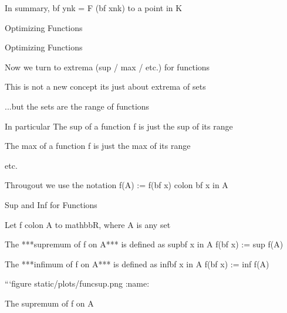 \documentclass[letterpaper,10pt,english]{jupyterBook}
\begin{document}
\begin{sphinxVerbatim}[commandchars=\\\{\}]
\PYGZpc{}In summary, \PYGZdl{}\PYGZob{}\PYGZbs{}bf y\PYGZcb{}\PYGZus{}\PYGZob{}n\PYGZus{}k\PYGZcb{} = F (\PYGZob{}\PYGZbs{}bf x\PYGZcb{}\PYGZus{}\PYGZob{}n\PYGZus{}k\PYGZcb{}) \PYGZbs{}to\PYGZdl{} a point in \PYGZdl{}K\PYGZdl{}

\PYGZpc{}

\PYGZsh{}\PYGZsh{} Optimizing Functions

\PYGZsh{}\PYGZsh{}\PYGZsh{} Optimizing Functions

Now we turn to extrema (sup / max / etc.) for functions

This is not a new concept \PYGZhy{}\PYGZhy{}\PYGZhy{} it\PYGZsq{}s just about extrema of sets

...but the sets are the range of functions

In particular
\PYGZpc{}
\PYGZhy{} The sup of a function \PYGZdl{}f\PYGZdl{} is just the sup of its range

\PYGZhy{} The max of a function \PYGZdl{}f\PYGZdl{} is just the max of its range

\PYGZhy{} etc.

Througout we use the notation
\PYGZpc{}
\PYGZdl{}\PYGZdl{}
\PYGZpc{}
f(A) := \PYGZbs{}\PYGZob{} f(\PYGZob{}\PYGZbs{}bf x\PYGZcb{}) \PYGZbs{}colon \PYGZob{}\PYGZbs{}bf x \PYGZbs{}\PYGZcb{} \PYGZbs{}in A\PYGZcb{}
\PYGZpc{}
\PYGZdl{}\PYGZdl{}
\PYGZpc{}

\PYGZsh{}\PYGZsh{}\PYGZsh{} Sup and Inf for Functions

Let \PYGZdl{}f \PYGZbs{}colon A \PYGZbs{}to \PYGZbs{}mathbb\PYGZob{}R\PYGZcb{}\PYGZdl{}, where \PYGZdl{}A\PYGZdl{} is any set 

The ***supremum of \PYGZdl{}f\PYGZdl{} on \PYGZdl{}A\PYGZdl{}*** is defined as
\PYGZpc{}
\PYGZdl{}\PYGZdl{}
\PYGZpc{}
\PYGZbs{}sup\PYGZus{}\PYGZob{}\PYGZob{}\PYGZbs{}bf x\PYGZcb{} \PYGZbs{}in A\PYGZcb{} f(\PYGZob{}\PYGZbs{}bf x\PYGZcb{}) 
:= \PYGZbs{}sup f(A)
\PYGZpc{}
\PYGZdl{}\PYGZdl{}
\PYGZpc{}

The ***infimum of \PYGZdl{}f\PYGZdl{} on \PYGZdl{}A\PYGZdl{}*** is defined as
\PYGZpc{} 
\PYGZpc{}
\PYGZdl{}\PYGZdl{}
\PYGZpc{}
\PYGZbs{}inf\PYGZus{}\PYGZob{}\PYGZob{}\PYGZbs{}bf x\PYGZcb{} \PYGZbs{}in A\PYGZcb{} f(\PYGZob{}\PYGZbs{}bf x\PYGZcb{}) 
:= \PYGZbs{}inf f(A)
\PYGZpc{}
\PYGZdl{}\PYGZdl{}
\PYGZpc{}

```\PYGZob{}figure\PYGZcb{} \PYGZus{}static/plots/func\PYGZus{}sup.png
:name: 

The supremum of \PYGZdl{}f\PYGZdl{} on \PYGZdl{}A\PYGZdl{}
\end{sphinxVerbatim}
\end{document}
